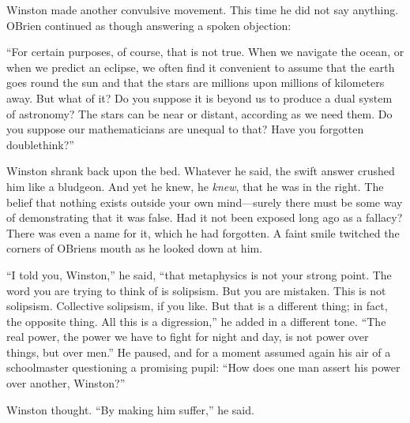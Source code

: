 Winston made another convulsive movement. This time he did not say
anything. O\textquotesingle Brien continued as though answering a spoken
objection:

``For certain purposes, of course, that is not true. When we navigate the
ocean, or when we predict an eclipse, we often find it convenient to
assume that the earth goes round the sun and that the stars are millions
upon millions of kilometers away. But what of it? Do you suppose it is
beyond us to produce a dual system of astronomy? The stars can be near
or distant, according as we need them. Do you suppose our mathematicians
are unequal to that? Have you forgotten doublethink?''

Winston shrank back upon the bed. Whatever he said, the swift answer
crushed him like a bludgeon. And yet he knew, he \emph{knew}, that he
was in the right. The belief that nothing exists outside your own
mind---surely there must be some way of demonstrating that it was false.
Had it not been exposed long ago as a fallacy? There was even a name for
it, which he had forgotten. A faint smile twitched the corners of
O\textquotesingle Brien\textquotesingle s mouth as he looked down at
him.

``I told you, Winston,'' he said, ``that metaphysics is not your strong
point. The word you are trying to think of is solipsism. But you are
mistaken. This is not solipsism. Collective solipsism, if you like. But
that is a different thing; in fact, the opposite thing. All this is a
digression,'' he added in a different tone. ``The real power, the power we
have to fight for night and day, is not power over things, but over
men.'' He paused, and for a moment assumed again his air of a
schoolmaster questioning a promising pupil: ``How does one man assert his
power over another, Winston?''

Winston thought. ``By making him suffer,'' he said.


